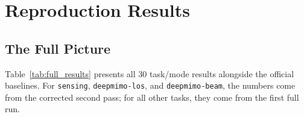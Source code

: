 \documentclass[11pt]{article}
\newcommand{\code}[1]{\texttt{#1}}
\begin{document}
\section{Reproduction Results}
\label{sec:results}

\subsection{The Full Picture}

Table~\ref{tab:full_results} presents all 30 task/mode results alongside the official baselines. For \code{sensing}, \code{deepmimo-los}, and \code{deepmimo-beam}, the numbers come from the corrected second pass; for all other tasks, they come from the first full run.
\end{document}
